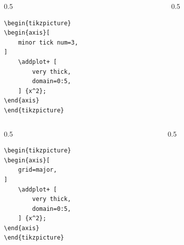 \documentclass[12pt,aspectratio=169,ignorenonframetext]{ltxbeamer}
\begin{document}
\begin{frame}[fragile]
\bigskip

\begin{columns}
    \begin{column}{0.5\textwidth}
        \begin{verbatim}
\begin{tikzpicture}
\begin{axis}[
    minor tick num=3,
]
    \addplot+ [
        very thick,
        domain=0:5,
    ] {x^2};
\end{axis}
\end{tikzpicture}
        \end{verbatim}
    \end{column}
    {\color{gray} \vline}
    \begin{column}{0.5\textwidth}
        \lmr
    \end{column}
\end{columns}
\end{frame}





\begin{frame}[fragile]
\bigskip

\begin{columns}
    \begin{column}{0.5\textwidth}
        \begin{verbatim}
\begin{tikzpicture}
\begin{axis}[
    grid=major,
]
    \addplot+ [
        very thick,
        domain=0:5,
    ] {x^2};
\end{axis}
\end{tikzpicture}
        \end{verbatim}
    \end{column}
    {\color{gray} \vline}
    \begin{column}{0.5\textwidth}
        \lmr
    \end{column}
\end{columns}
\end{frame}
\end{document}

